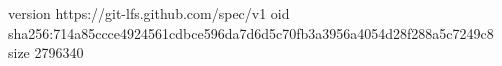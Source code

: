 version https://git-lfs.github.com/spec/v1
oid sha256:714a85ccce4924561cdbce596da7d6d5c70fb3a3956a4054d28f288a5c7249c8
size 2796340
